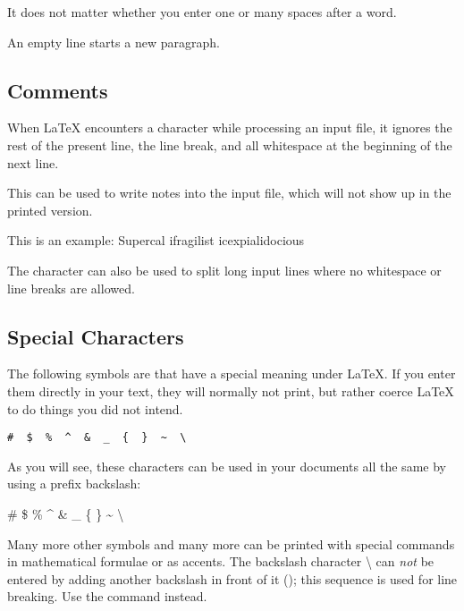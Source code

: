 \begin{example}
It does not matter whether you
enter one or many     spaces
after a word.

An empty line starts a new
paragraph.
\end{example}

\subsection{Comments}\label{sec:comments}

When \LaTeX{} encounters a \ai{\%} character while processing an input file,
it ignores the rest of the present line, the line break, and all
whitespace at the beginning of the next line.

This can be used to write notes into the input file, which will not show up
in the printed version.

\begin{example}
This is an %
example: Supercal%
              ifragilist%
    icexpialidocious
\end{example}

The \ai{\%} character can also be used to split long input lines where no
whitespace or line breaks are allowed.

\subsection{Special Characters}

The following symbols are  that have a special meaning
under \LaTeX{}. If you enter them directly in your text, they will normally not
print, but rather coerce \LaTeX{} to do things you did not intend.
\begin{code}
\verb.#  $  %  ^  &  _  {  }  ~  \ .
\end{code}

As you will see, these characters can be used in your documents all
the same by using a prefix backslash:

\begin{example}
\# \$ \% \^{} \& \_ \{ \} \~{}
\textbackslash{}
\end{example}

Many more other symbols and many more can be printed with special commands
in mathematical formulae or as accents. The backslash character
\textbackslash{} can \emph{not} be entered by adding another backslash
in front of it (\csi{\bs}); this sequence is used for
line breaking. Use the  command instead.

